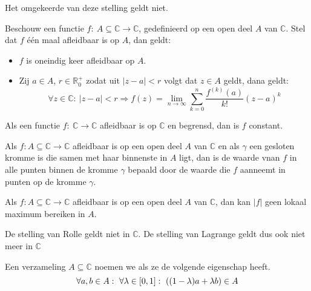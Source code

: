 \documentclass[main.tex]{subfiles}
\begin{document}
\begin{tvb}
  Het omgekeerde van deze stelling geldt niet.
\end{tvb}


\begin{bst}
  Beschouw een functie $f:\ A \subseteq \mathbb{C} \rightarrow \mathbb{C}$, gedefinieerd op een open deel $A$ van $\mathbb{C}$.
  Stel dat $f$ \'e\'en maal afleidbaar is op $A$, dan geldt:
  \begin{itemize}
  \item $f$ is oneindig keer afleidbaar op $A$.
  \item Zij $a\in A$, $r\in \mathbb{R}_{0}^{+}$ zodat uit $|z-a|< r$ volgt dat $z\in A$ geldt, dana geldt:
    \[ \forall z\in \mathbb{C}:\ |z-a|< r \Rightarrow f(z) = \lim_{n \rightarrow \infty}\sum_{k=0}^{n}\frac{f^{(k)}(a)}{k!}(z-a)^{k} \]
  \end{itemize}
\zb
\end{bst}

\begin{st}
  Als een functie $f:\ \mathbb{C} \rightarrow \mathbb{C}$ afleidbaar is op $\mathbb{C}$ en begrensd, dan is $f$ constant.
\zb
\end{st}

\begin{st}
  Als $f: A \subseteq \mathbb{C} \rightarrow \mathbb{C}$ afleidbaar is op een open deel $A$ van $\mathbb{C}$ en als $\gamma$ een gesloten kromme is die samen met haar binnenste in $A$ ligt, dan is de waarde vnan $f$ in alle punten binnen de kromme $\gamma$ bepaald door de waarde die $f$ aanneemt in punten op de kromme $\gamma$.
\zb
\end{st}

\begin{st}
  Als $f: A \subseteq \mathbb{C} \rightarrow \mathbb{C}$ afleidbaar is op een open deel $A$ van $\mathbb{C}$, dan kan $|f|$ geen lokaal maximum bereiken in $A$.
\zb
\end{st}

\begin{gst}
  De stelling van Rolle geldt niet in $\mathbb{C}$.
  De stelling van Lagrange geldt dus ook niet meer in $\mathbb{C}$
\end{gst}

\begin{de}
  Een verzameling $A \subseteq \mathbb{C}$ noemen we  als ze de volgende eigenschap heeft.
  \[ \forall a,b \in A:\ \forall \lambda \in \interval{0}{1}:\ ((1-\lambda)a+\lambda b) \in A \]
\end{de}
\end{document}

